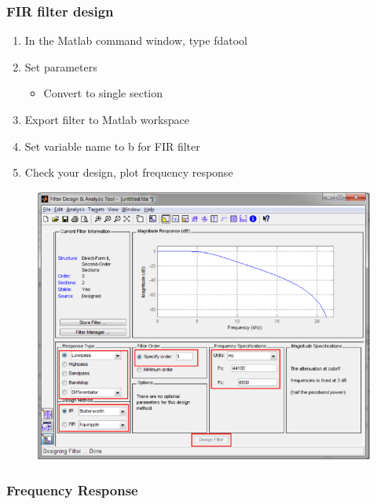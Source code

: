 \documentclass[hyperref={pdfpagelabels=true}]{beamer}
\begin{document}
\begin{frame}
\frametitle{FIR filter design}
\begin{enumerate}
\item In the Matlab command window, type fdatool
\item Set parameters
\begin{itemize}
\item Convert to single section
\end{itemize}
\item Export filter to Matlab workspace
\item Set variable name to b for FIR filter
\item Check your design, plot frequency response
\end{enumerate}
\begin{figure}[!tbp]
\centering
\includegraphics[width=\textwidth,height=\textheight,keepaspectratio]{figs/fdc.png}
\end{figure}
\end{frame}








\begin{frame}
\frametitle{Frequency Response}
\end{frame}
\end{document}
